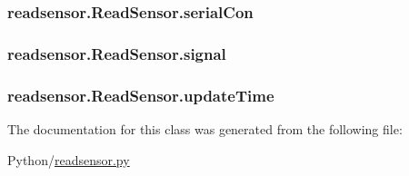 \subsubsection[{\texorpdfstring{serial\+Con}{serialCon}}]{\setlength{\rightskip}{0pt plus 5cm}readsensor.\+Read\+Sensor.\+serial\+Con}\hypertarget{classreadsensor_1_1ReadSensor_ab85a47186a692e87ed91dfbd6421ac9f}{}\label{classreadsensor_1_1ReadSensor_ab85a47186a692e87ed91dfbd6421ac9f}
\subsubsection[{\texorpdfstring{signal}{signal}}]{\setlength{\rightskip}{0pt plus 5cm}readsensor.\+Read\+Sensor.\+signal}\hypertarget{classreadsensor_1_1ReadSensor_a1e626c0e06fbf1b266d9bb39c363196c}{}\label{classreadsensor_1_1ReadSensor_a1e626c0e06fbf1b266d9bb39c363196c}
\subsubsection[{\texorpdfstring{update\+Time}{updateTime}}]{\setlength{\rightskip}{0pt plus 5cm}readsensor.\+Read\+Sensor.\+update\+Time}\hypertarget{classreadsensor_1_1ReadSensor_adb42967437e88c29257d8fa7e6dcd8e2}{}\label{classreadsensor_1_1ReadSensor_adb42967437e88c29257d8fa7e6dcd8e2}


The documentation for this class was generated from the following file\+:\begin{DoxyCompactItemize}
\item 
Python/\hyperlink{readsensor_8py}{readsensor.\+py}\end{DoxyCompactItemize}
